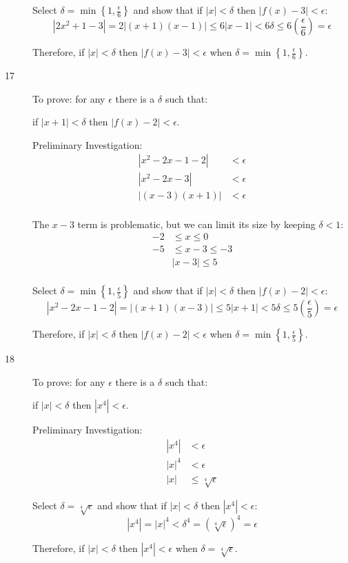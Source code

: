 \documentclass{exam}
\begin{document}
\begin{description}
Select $\delta = \min \left\{1, \frac{\epsilon}{6} \right\}$ and show that if $|x| < \delta$ then $|f(x) - 3| < \epsilon$:
\[
  |2x^2 + 1 - 3 | = 2|(x+1)(x-1)| \leq 6 | x-1 | < 6 \delta \leq 6 \left( \frac{\epsilon}{6} \right) = \epsilon
\]

Therefore, if $|x| < \delta$ then $|f(x) - 3| < \epsilon$ when $\delta = \min \left\{1, \frac{\epsilon}{6} \right\}$.

\item[17]
To prove: for any $\epsilon$ there is a $\delta$ such that:

if $|x + 1| < \delta$ then $|f(x) - 2| < \epsilon$.

Preliminary Investigation:
\begin{align*}
  |x^2 - 2x - 1 -2| &< \epsilon \\
  |x^2 - 2x - 3| &< \epsilon \\
  |(x-3)(x+1)| &< \epsilon \\
\end{align*}

The $x-3$ term is problematic, but we can limit its size by keeping $\delta < 1$:
\begin{align*}
  -2 &\leq x \leq 0 \\
  -5 &\leq x - 3 \leq -3 \\
  & |x-3| \leq 5 \\
\end{align*}

Select $\delta = \min \left\{1, \frac{\epsilon}{5} \right\}$ and show that if $|x| < \delta$ then $|f(x) - 2| < \epsilon$:
\[
  |x^2 -2x - 1 - 2 | = |(x+1)(x-3)| \leq 5 | x+1 | < 5 \delta \leq 5 \left( \frac{\epsilon}{5} \right) = \epsilon
\]

Therefore, if $|x| < \delta$ then $|f(x) - 2| < \epsilon$ when $\delta = \min \left\{1, \frac{\epsilon}{5} \right\}$.

\item[18]
To prove: for any $\epsilon$ there is a $\delta$ such that:

if $|x| < \delta$ then $|x^4| < \epsilon$.

Preliminary Investigation:
\begin{align*}
  |x^4| &< \epsilon \\
  |x|^4 &< \epsilon \\
  |x| &\leq \sqrt[4]{\epsilon}
\end{align*}

Select $\delta = \sqrt[4]{\epsilon}$ and show that if $|x| < \delta$ then $|x^4| < \epsilon$:
\[
  |x^4| = |x|^4 < \delta^4 = (\sqrt[4]{\epsilon})^4 = \epsilon
\]

Therefore, if $|x| < \delta$ then $|x^4| < \epsilon$ when $\delta = \sqrt[4]{\epsilon}$.

\end{description}
\end{document}

